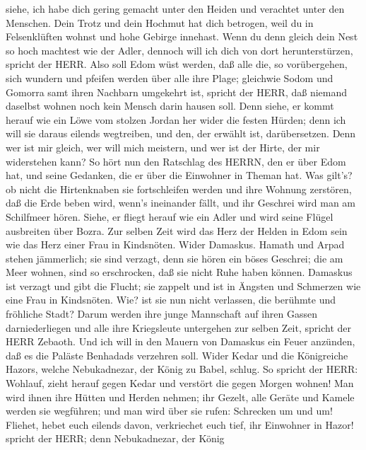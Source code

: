 siehe, ich habe dich gering gemacht unter den Heiden und verachtet unter
den Menschen.  Dein Trotz und dein Hochmut hat dich
betrogen, weil du in Felsenklüften wohnst und hohe Gebirge innehast.
Wenn du denn gleich dein Nest so hoch machtest wie der Adler, dennoch
will ich dich von dort herunterstürzen, spricht der HERR. 
Also soll Edom wüst werden, daß alle die, so vorübergehen, sich wundern
und pfeifen werden über alle ihre Plage;  gleichwie Sodom
und Gomorra samt ihren Nachbarn umgekehrt ist, spricht der HERR, daß
niemand daselbst wohnen noch kein Mensch darin hausen soll.
 Denn siehe, er kommt herauf wie ein Löwe vom stolzen
Jordan her wider die festen Hürden; denn ich will sie daraus eilends
wegtreiben, und den, der erwählt ist, darübersetzen. Denn wer ist mir
gleich, wer will mich meistern, und wer ist der Hirte, der mir
widerstehen kann?  So hört nun den Ratschlag des HERRN, den
er über Edom hat, und seine Gedanken, die er über die Einwohner in
Theman hat. Was gilt's? ob nicht die Hirtenknaben sie fortschleifen
werden und ihre Wohnung zerstören,  daß die Erde beben
wird, wenn's ineinander fällt, und ihr Geschrei wird man am Schilfmeer
hören.  Siehe, er fliegt herauf wie ein Adler und wird
seine Flügel ausbreiten über Bozra. Zur selben Zeit wird das Herz der
Helden in Edom sein wie das Herz einer Frau in Kindsnöten. 
Wider Damaskus. Hamath und Arpad stehen jämmerlich; sie sind verzagt,
denn sie hören ein böses Geschrei; die am Meer wohnen, sind so
erschrocken, daß sie nicht Ruhe haben können.  Damaskus ist
verzagt und gibt die Flucht; sie zappelt und ist in Ängsten und
Schmerzen wie eine Frau in Kindsnöten.  Wie? ist sie nun
nicht verlassen, die berühmte und fröhliche Stadt?  Darum
werden ihre junge Mannschaft auf ihren Gassen darniederliegen und alle
ihre Kriegsleute untergehen zur selben Zeit, spricht der HERR Zebaoth.
 Und ich will in den Mauern von Damaskus ein Feuer
anzünden, daß es die Paläste Benhadads verzehren soll. 
Wider Kedar und die Königreiche Hazors, welche Nebukadnezar, der König
zu Babel, schlug. So spricht der HERR: Wohlauf, zieht herauf gegen Kedar
und verstört die gegen Morgen wohnen!  Man wird ihnen ihre
Hütten und Herden nehmen; ihr Gezelt, alle Geräte und Kamele werden sie
wegführen; und man wird über sie rufen: Schrecken um und um!
 Fliehet, hebet euch eilends davon, verkriechet euch tief,
ihr Einwohner in Hazor! spricht der HERR; denn Nebukadnezar, der König
